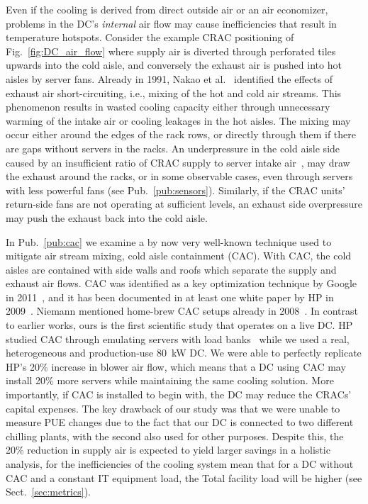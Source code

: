\documentclass[officiallayout]{tktla}
\begin{document}
Even if the cooling is derived from direct outside air or an air economizer,
problems in the DC's \emph{internal} air flow may cause inefficiencies that
result in temperature hotspots.  Consider the example CRAC positioning of
Fig.~\ref{fig:DC_air_flow} where supply air is diverted through perforated
tiles upwards into the cold aisle, and conversely the exhaust air is pushed
into hot aisles by server fans.  Already in 1991, Nakao et
al.~\cite{Nakao1991} identified the effects of exhaust air short-circuiting,
i.e., mixing of the hot and cold air streams.  This phenomenon results in
wasted cooling capacity either through unnecessary warming of the intake air
or cooling leakages in the hot aisles.  The mixing may occur either around the
edges of the rack rows, or directly through them if there are gaps without
servers in the racks. An underpressure in the cold aisle side caused by an
insufficient ratio of CRAC supply to server intake
air~\cite{Germagian2009,Seymour2011}, may draw the exhaust around the racks,
or in some observable cases, even through servers with less powerful fans (see
Pub.~\ref{pub:sensors}). Similarly, if the CRAC units' return-side fans are
not operating at sufficient levels, an exhaust side overpressure may push the
exhaust back into the cold aisle.

In Pub.~\ref{pub:cac} we examine a by now very well-known technique used to
mitigate air stream mixing, cold aisle containment (CAC). With CAC, the cold
aisles are contained with side walls and roofs which separate the supply and
exhaust air flows. CAC was identified as a key optimization technique by
Google in 2011~\cite{Google2011}, and it has been documented in at least one
white paper by HP in 2009~\cite{Hilss2009}. Niemann mentioned home-brew CAC
setups already in 2008~\cite{Niemann2008}. In contrast to earlier works, ours
is the first scientific study that operates on a live DC. HP studied CAC
through emulating servers with load banks~\cite{Hilss2009} while we used a
real, heterogeneous and production-use 80~kW DC. We were able to perfectly
replicate HP's 20\% increase in blower air flow, which means that a DC using
CAC may install 20\% more servers while maintaining the same cooling solution.
More importantly, if CAC is installed to begin with, the DC may reduce the
CRACs' capital expenses. The key drawback of our study was that we were unable
to measure PUE changes due to the fact that our DC is connected to two
different chilling plants, with the second also used for other purposes.
Despite this, the 20\% reduction in supply air is expected to yield larger
savings in a holistic analysis, for the inefficiencies of the cooling system
mean that for a DC without CAC and a constant IT equipment load, the Total
facility load will be higher (see Sect.~\ref{sec:metrics}).
\end{document}
